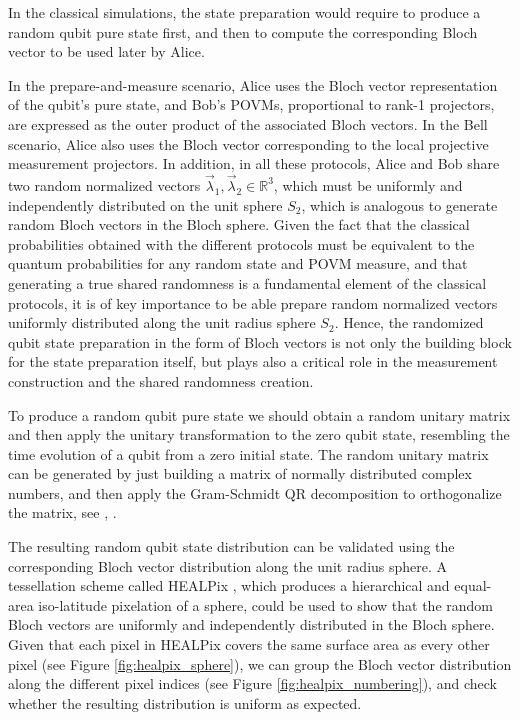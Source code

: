 In the classical simulations, the state preparation would require to produce a random qubit pure state first, and then to compute the corresponding Bloch vector to be used later by Alice. 

In the prepare-and-measure scenario, Alice uses the Bloch vector representation of the qubit's pure state, and Bob's POVMs,  proportional to rank-1 projectors, are expressed as the outer product of the associated Bloch vectors. In the Bell scenario, Alice also uses the Bloch vector corresponding to the local projective measurement projectors. In addition, in all these protocols, Alice and Bob share two random normalized vectors $\vec{\lambda}_1, \vec{\lambda}_2 \in \mathbb{R}^{3}$, which must be uniformly and independently distributed on the unit sphere $S_2$, which is analogous to generate random Bloch vectors in the Bloch sphere. Given the fact that the classical probabilities obtained with the different protocols must be equivalent to the quantum probabilities for any random state and POVM measure, and that generating a true shared randomness is a fundamental element of the classical protocols, it is of key importance to be able prepare random normalized vectors uniformly distributed along the unit radius sphere $S_2$. Hence, the randomized qubit state preparation in the form of Bloch vectors is not only the building block for the state preparation itself, but plays also a critical role in the measurement construction and the shared randomness creation.

To produce a random qubit pure state we should obtain a random unitary matrix and then apply the unitary transformation to the zero qubit state, resembling the time evolution of a qubit from a zero initial state. The random unitary matrix can be generated by just building a matrix of normally distributed complex numbers, and then apply the Gram-Schmidt QR decomposition to orthogonalize the matrix, see \cite{ozols2009}, \cite{zyczkowski1994}. 

The resulting random qubit state distribution can be validated using the corresponding Bloch vector distribution along the unit radius sphere. A tessellation scheme called HEALPix \cite{healpix}, which produces a hierarchical and equal-area iso-latitude pixelation of a sphere, could be used to show that the random Bloch vectors are uniformly and independently distributed in the Bloch sphere. Given that each pixel in HEALPix covers the same surface area as every other pixel (see Figure \ref{fig:healpix_sphere}), we can group the Bloch vector distribution along the different pixel indices (see Figure \ref{fig:healpix_numbering}), and check whether the resulting distribution is uniform as expected.

